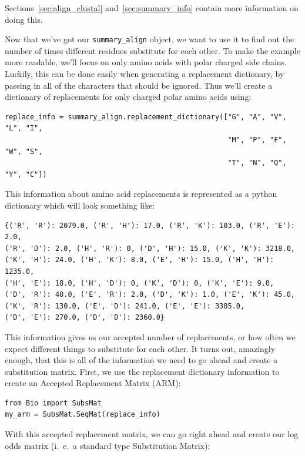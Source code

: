 \documentclass{report}
\begin{document}
Sections~\ref{sec:align_clustal} and~\ref{sec:summary_info} contain
more information on doing this.


Now that we've got our \verb|summary_align| object, we want to use it
to find out the number of times different residues substitute for each
other. To make the example more readable, we'll focus on only amino
acids with polar charged side chains. Luckily, this can be done easily 
when generating a replacement dictionary, by passing in all of the
characters that should be ignored. Thus we'll create a dictionary of
replacements for only charged polar amino acids using:

\begin{verbatim}
replace_info = summary_align.replacement_dictionary(["G", "A", "V", "L", "I",
                                                     "M", "P", "F", "W", "S",
                                                     "T", "N", "Q", "Y", "C"])
\end{verbatim}

This information about amino acid replacements is represented as a
python dictionary which will look something like:


\begin{verbatim}
{('R', 'R'): 2079.0, ('R', 'H'): 17.0, ('R', 'K'): 103.0, ('R', 'E'): 2.0, 
('R', 'D'): 2.0, ('H', 'R'): 0, ('D', 'H'): 15.0, ('K', 'K'): 3218.0, 
('K', 'H'): 24.0, ('H', 'K'): 8.0, ('E', 'H'): 15.0, ('H', 'H'): 1235.0, 
('H', 'E'): 18.0, ('H', 'D'): 0, ('K', 'D'): 0, ('K', 'E'): 9.0, 
('D', 'R'): 48.0, ('E', 'R'): 2.0, ('D', 'K'): 1.0, ('E', 'K'): 45.0, 
('K', 'R'): 130.0, ('E', 'D'): 241.0, ('E', 'E'): 3305.0, 
('D', 'E'): 270.0, ('D', 'D'): 2360.0}
\end{verbatim}

This information gives us our accepted number of replacements, or how
often we expect different things to substitute for each other. It
turns out, amazingly enough, that this is all of the information we
need to go ahead and create a substitution matrix. First, we use the
replacement dictionary information to create an Accepted Replacement
Matrix (ARM):


\begin{verbatim}
from Bio import SubsMat
my_arm = SubsMat.SeqMat(replace_info)
\end{verbatim}

With this accepted replacement matrix, we can go right ahead and
create our log odds matrix (i.~e.~a standard type Substitution Matrix):
\end{document}
